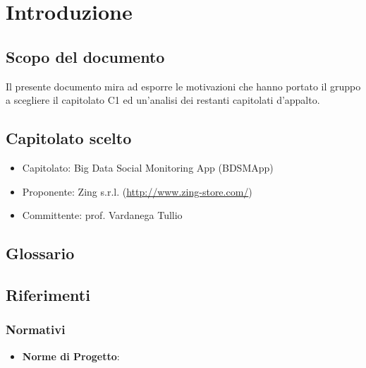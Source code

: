 %


\section{Introduzione}

	\subsection{Scopo del documento}
	Il presente documento mira ad esporre le motivazioni che hanno portato il gruppo a scegliere il capitolato C1 ed un'analisi dei restanti capitolati d'appalto.

	\subsection{Capitolato scelto}
	\begin{itemize}
		\item Capitolato: Big Data Social Monitoring App (BDSMApp)
		\item Proponente: Zing s.r.l. (\url{http://www.zing-store.com/})
		\item Committente: prof. Vardanega Tullio
	\end{itemize}

	\subsection{Glossario}
	\glossarioDesc

	\subsection{Riferimenti}
		\subsubsection{Normativi}
		\begin{itemize}
			\item \textbf{Norme di Progetto}: \docNameVersionNdP
		\end{itemize}


